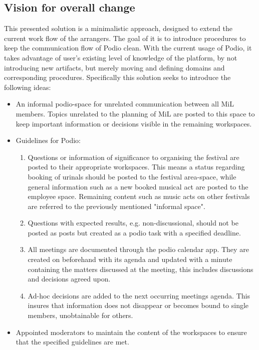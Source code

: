\subsection{Vision for overall change} 
This presented solution is a minimalistic approach, designed to extend the current work flow of the
arrangers. The goal of it is to introduce procedures to keep the communication flow of Podio clean.
With the current usage of Podio, it takes advantage of user's existing level of knowledge of the
platform, by not introducing new artifacts, but merely moving and defining domains and corresponding procedures. Specifically this solution seeks to introduce the following ideas:

\begin{itemize}
    \item An informal podio-space for unrelated communication between all MiL members. Topics unrelated to the planning of MiL are posted to this space to keep important information or decisions visible in the remaining workspaces.
    \item Guidelines for Podio:
    \begin{enumerate}
        \item Questions or information of significance to organising the festival are posted to
        their appropriate workspaces. This means a status regarding booking of urinals should be
        posted to the festival area-space, while general information such as a new booked musical
        act are posted to the employee space. Remaining content such as music acts on other
        festivals are referred to the previously mentioned "informal space".
        \item Questions with expected results, e.g. non-discussional, should not be posted as posts but created as a podio task with a specified deadline. 
        \item All meetings are documented through the podio calendar app. They are created on
        beforehand with its agenda and updated with a minute containing the matters discussed at the
        meeting, this includes discussions and decisions agreed upon.
        \item Ad-hoc decisions are added to the next occurring meetings agenda. This insures that
        information does not disappear or becomes bound to single members, unobtainable for others.
    \end{enumerate}
    \item Appointed moderators to maintain the content of the workspaces to ensure that the specified guidelines are met.
\end{itemize}

